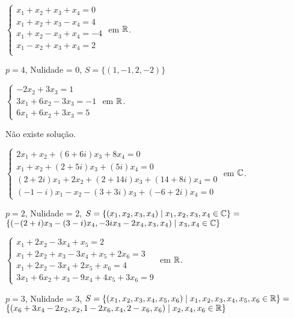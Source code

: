 \documentclass[12pt]{exam}
\begin{document}
\begin{exercicio}
  $
    \begin{cases}
      x_1 + x_2 + x_3 + x_4 = 0\\
      x_1 + x_2 + x_3 - x_4 = 4\\
      x_1 + x_2 - x_3 + x_4 = -4\\
      x_1 - x_2 + x_3 + x_4 = 2\\
    \end{cases}
  $
  em $\mathbb{R}$.
  \begin{solucao}
    $p = 4$, Nulidade = 0, $S = \{(1, -1, 2, -2)\}$
  \end{solucao}
\end{exercicio}

\begin{exercicio}
  $
    \begin{cases}
      -2x_2 + 3x_3 = 1\\
      3x_1 + 6x_2 - 3x_3 = -1\\
      6x_1 + 6x_2 + 3x_3 = 5
    \end{cases}
  $
  em $\mathbb{R}$.
  \begin{solucao}
    N\~ao existe solu\c{c}\~ao.
  \end{solucao}
\end{exercicio}

\begin{exercicio}
  $
    \begin{cases}
      2x_1 + x_2 + (6 + 6i)x_3 + 8x_4 = 0\\
      x_1 + x_2 + (2 + 5i)x_3 + (5  i)x_4 = 0\\
      (2 + 2i)x_1 + 2x_2 + (2 + 14i)x_3 + (14 + 8i)x_4 =0\\
      (-1 - i)x_1 - x_2 - (3 + 3i)x_3 + (-6 + 2i)x_4 = 0
    \end{cases}
  $
  em $\mathbb{C}$.
  \begin{solucao}
    $p = 2$, Nulidade = 2, $S = \{(x_1, x_2, x_3, x_4) \mid x_1, x_2, x_3, x_4 \in \mathbb{C}\} = $\\ $\{(-(2 + i)x_3 - (3 - i)x_4,-3ix_3 - 2x_4, x_3, x_4) \mid x_3, x_4 \in \mathbb{C}\}$
  \end{solucao}
\end{exercicio}

\begin{exercicio}
  $
    \begin{cases}
      x_1 + 2x_2 - 3x_4 + x_5 = 2\\
      x_1 + 2x_2 + x_3 - 3x_4 + x_5 + 2x_6 = 3\\
      x_1 + 2x_2 - 3x_4 + 2x_5 + x_6 = 4\\
      3x_1 + 6x_2 + x_3 - 9x_4 + 4x_5 + 3x_6 = 9
    \end{cases}
  $
  em $\mathbb{R}$.
  \begin{solucao}
    $p = 3$, Nulidade = 3, $S = \{(x_1, x_2, x_3, x_4, x_5, x_6) \mid x_1, x_2, x_3, x_4, x_5, x_6 \in \mathbb{R}\} = $\\ $\{(x_6 + 3x_4 - 2x_2, x_2, 1 - 2x_6, x_4, 2 - x_6, x_6) \mid x_2, x_4, x_6 \in \mathbb{R}\}$
  \end{solucao}
\end{exercicio}
\end{document}
